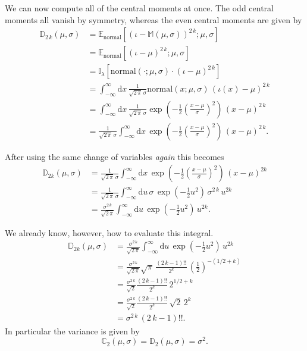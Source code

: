 \documentclass[
  letterpaper,
  DIV=11,
  numbers=noendperiod]{scrartcl}
\begin{document}
We can now compute all of the central moments at once. The odd central
moments all vanish by symmetry, whereas the even central moments are
given by \begin{align*}
\mathbb{D}_{2 \, k}(\mu, \sigma)
&=
\mathbb{E}_{\mathrm{normal}}
[ \left( \iota - \mathbb{M}(\mu, \sigma) \right)^{2 \, k} ; \mu, \sigma ]
\\
&=
\mathbb{E}_{\mathrm{normal}}
[ \left( \iota - \mu \right)^{2 \,k} ; \mu, \sigma ]
\\
&=
\mathbb{I}_{\lambda}
[\mathrm{normal}(\cdot; \mu, \sigma) \cdot \left( \iota - \mu \right)^{2 \, k} ]
\\
&=
\int_{-\infty}^{\infty} \mathrm{d} x \, \frac{1}{\sqrt{2 \, \pi} \, \sigma}
\mathrm{normal}(x; \mu, \sigma) \, \left( \iota(x) - \mu \right)^{2 \,k}
\\
&=
\int_{-\infty}^{\infty} \mathrm{d} x \, \frac{1}{\sqrt{2 \, \pi} \, \sigma}
\exp \left( -\frac{1}{2} \left( \frac{x - \mu}{\sigma} \right)^{2} \right) \,
\left( x - \mu \right)^{2 \,k}
\\
&=
\frac{1}{\sqrt{2 \, \pi} \, \sigma} \int_{-\infty}^{\infty} \mathrm{d} x \,
\exp \left( -\frac{1}{2} \left( \frac{x - \mu}{\sigma} \right)^{2} \right) \,
\left( x - \mu \right)^{2 \,k}.
\end{align*}

After using the same change of variables \emph{again} this becomes
\begin{align*}
\mathbb{D}_{2 k}(\mu, \sigma)
&=
\frac{1}{\sqrt{2 \, \pi} \, \sigma}
\int_{-\infty}^{\infty} \mathrm{d} x \,
\exp \left( -\frac{1}{2} \left( \frac{x - \mu}{\sigma} \right)^{2} \right) \,
\left( x - \mu \right)^{2 k}
\\
&=
\frac{1}{\sqrt{2 \, \pi} \, \sigma}
\int_{-\infty}^{\infty} \mathrm{d} u \, \sigma \,
\exp \left( -\frac{1}{2} u^{2} \right) \, \sigma^{2 \, k} \, u^{2 k}
\\
&=
\frac{\sigma^{2 \, k} }{\sqrt{2 \, \pi}}
\int_{-\infty}^{\infty} \mathrm{d} u \,
\exp \left( -\frac{1}{2} u^{2} \right) \, u^{2 k}.
\end{align*}

We already know, however, how to evaluate this integral. \begin{align*}
\mathbb{D}_{2 k}(\mu, \sigma)
&=
\frac{\sigma^{2 \, k} }{\sqrt{2 \, \pi}}
\int_{-\infty}^{\infty} \mathrm{d} u \,
\exp \left( -\frac{1}{2} u^{2} \right) \, u^{2 k}
\\
&=
\frac{\sigma^{2 \, k} }{\sqrt{2 \, \pi}}
\sqrt{\pi} \, \frac{ (2 \, k - 1)!! }{2^{k}} \,
\left( \frac{1}{2} \right)^{-(1/2 + k)}
\\
&=
\frac{\sigma^{2 \, k} }{\sqrt{2}} \frac{ (2 \, k - 1)!! }{2^{k}} \,
2^{1/2 + k}
\\
&=
\frac{\sigma^{2 \, k} }{\sqrt{2}} \frac{ (2 \, k - 1)!! }{2^{k}} \,
\sqrt{2} \, 2^{k}
\\
&=
\sigma^{2 \, k} \, (2 \, k - 1)!!.
\end{align*} In particular the variance is given by \[
\mathbb{C}_{2}(\mu, \sigma) = \mathbb{D}_{2}(\mu, \sigma) = \sigma^{2}.
\]
\end{document}
